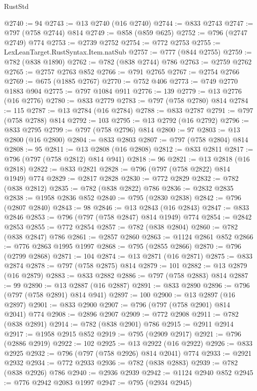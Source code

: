 \begin{lexlean}{RustStd}
\begin{coremodule}
@2740 := 94
@2743 := @13 @2740 (@16 @2740)
@2744 := @833 @2743
@2747 := @797 (@758 @2744) @814
@2749 := @858 (@859 @625)
@2752 := @796 (@2747 @2749) @774
@2753 := @2739 @2752
@2754 := @772 @2753
@2755 := LexLeanTarget.RustSyntax.Item.natSub
@2757 := @777 (@844 @2755)
@2759 := @782 (@838 @1890)
@2762 := @782 (@838 @2744) @786
@2763 := @2759 @2762
@2765 := @2757 @2763 @852
@2766 := @791 @2765
@2767 := @2754 @2766
@2769 := @675 (@1885 @2767)
@2770 := @752 @406
@2773 := @749 @2770 @1883 @904
@2775 := @797 @1084 @911
@2776 := 139
@2779 := @13 @2776 (@16 @2776)
@2780 := @833 @2779
@2783 := @797 (@758 @2780) @814
@2784 := 115
@2787 := @13 @2784 (@16 @2784)
@2788 := @833 @2787
@2791 := @797 (@758 @2788) @814
@2792 := 103
@2795 := @13 @2792 (@16 @2792)
@2796 := @833 @2795
@2799 := @797 (@758 @2796) @814
@2800 := 97
@2803 := @13 @2800 (@16 @2800)
@2804 := @833 @2803
@2807 := @797 (@758 @2804) @814
@2808 := 95
@2811 := @13 @2808 (@16 @2808)
@2812 := @833 @2811
@2817 := @796 (@797 (@758 @2812) @814 @941)
@2818 := 96
@2821 := @13 @2818 (@16 @2818)
@2822 := @833 @2821
@2828 := @796 (@797 (@758 @2822) @814 @1949) @774
@2829 := @2817 @2828
@2830 := @772 @2829
@2832 := @782 (@838 @2812)
@2835 := @782 (@838 @2822) @786
@2836 := @2832 @2835
@2838 := @1958 @2836 @852
@2840 := @795 (@2830 @2838)
@2842 := @796 (@2807 @2840)
@2843 := 98
@2846 := @13 @2843 (@16 @2843)
@2847 := @833 @2846
@2853 := @796 (@797 (@758 @2847) @814 @1949) @774
@2854 := @2842 @2853
@2855 := @772 @2854
@2857 := @782 (@838 @2804)
@2860 := @782 (@838 @2847) @786
@2861 := @2857 @2860
@2863 := @1124 @2861 @852
@2866 := @776 @2863 @1995 @1997
@2868 := @795 (@2855 @2866)
@2870 := @796 (@2799 @2868)
@2871 := 104
@2874 := @13 @2871 (@16 @2871)
@2875 := @833 @2874
@2878 := @797 (@758 @2875) @814
@2879 := 101
@2882 := @13 @2879 (@16 @2879)
@2883 := @833 @2882
@2886 := @797 (@758 @2883) @814
@2887 := 99
@2890 := @13 @2887 (@16 @2887)
@2891 := @833 @2890
@2896 := @796 (@797 (@758 @2891) @814 @941)
@2897 := 100
@2900 := @13 @2897 (@16 @2897)
@2901 := @833 @2900
@2907 := @796 (@797 (@758 @2901) @814 @2041) @774
@2908 := @2896 @2907
@2909 := @772 @2908
@2911 := @782 (@838 @2891)
@2914 := @782 (@838 @2901) @786
@2915 := @2911 @2914
@2917 := @1958 @2915 @852
@2919 := @795 (@2909 @2917)
@2921 := @796 (@2886 @2919)
@2922 := 102
@2925 := @13 @2922 (@16 @2922)
@2926 := @833 @2925
@2932 := @796 (@797 (@758 @2926) @814 @2041) @774
@2933 := @2921 @2932
@2934 := @772 @2933
@2936 := @782 (@838 @2883)
@2939 := @782 (@838 @2926) @786
@2940 := @2936 @2939
@2942 := @1124 @2940 @852
@2945 := @776 @2942 @2083 @1997
@2947 := @795 (@2934 @2945)

\end{coremodule}
\end{lexlean}

